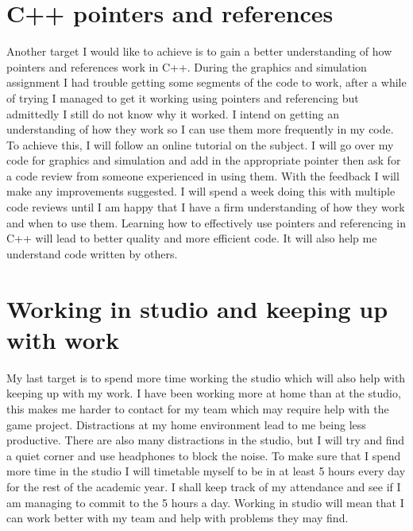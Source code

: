 \documentclass{scrartcl}
\begin{document}
\section{C++ pointers and references}
Another target I would like to achieve is to gain a better understanding of how pointers and references work in C++. During the graphics and simulation assignment I had trouble getting some segments of the code to work, after a while of trying I managed to get it working using pointers and referencing but admittedly I still do not know why it worked. I intend on getting an understanding of how they work so I can use them more frequently in my code.
\newline
\newline
To achieve this, I will follow an online tutorial on the subject. I will go over my code for graphics and simulation and add in the appropriate pointer then ask for a code review from someone experienced in using them. With the feedback I will make any improvements suggested. I will spend a week doing this with multiple code reviews until I am happy that I have a firm understanding of how they work and when to use them.
\newline
\newline
Learning how to effectively use pointers and referencing in C++ will lead to better quality and more efficient code. It will also help me understand code written by others.


\section{Working in studio and keeping up with work}
My last target is to spend more time working the studio which will also help with keeping up with my work. I have been working more at home than at the studio, this makes me harder to contact for my team which may require help with the game project. Distractions at my home environment lead to me being less productive. There are also many distractions in the studio, but I will try and find a quiet corner and use headphones to block the noise.
\newline
\newline
To make sure that I spend more time in the studio I will timetable myself to be in at least 5 hours every day for the rest of the academic year. I shall keep track of my attendance and see if I am managing to commit to the 5 hours a day.
\newline
\newline
Working in studio will mean that I can work better with my team and help with problems they may find.



\end{document}

